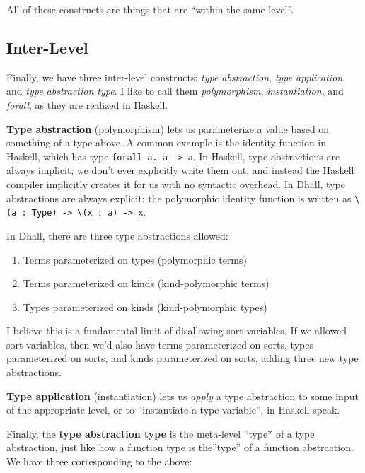 \documentclass[]{article}
\begin{document}
All of these constructs are things that are ``within the same level''.

\subsection{Inter-Level}\label{inter-level}

Finally, we have three inter-level constructs: \emph{type abstraction},
\emph{type application}, and \emph{type abstraction type}. I like to call them
\emph{polymorphism}, \emph{instantiation}, and \emph{forall}, as they are
realized in Haskell.

\textbf{Type abstraction} (polymorphism) lets us parameterize a value based on
something of a type above. A common example is the identity function in Haskell,
which has type \texttt{forall\ a.\ a\ -\textgreater{}\ a}. In Haskell, type
abstractions are always implicit; we don't ever explicitly write them out, and
instead the Haskell compiler implicitly creates it for us with no syntactic
overhead. In Dhall, type abstractions are always explicit: the polymorphic
identity function is written as
\texttt{\textbackslash{}(a\ :\ Type)\ -\textgreater{}\ \textbackslash{}(x\ :\ a)\ -\textgreater{}\ x}.

In Dhall, there are three type abstractions allowed:

\begin{enumerate}
\def\labelenumi{\arabic{enumi}.}
\tightlist
\item
  Terms parameterized on types (polymorphic terms)
\item
  Terms parameterized on kinds (kind-polymorphic terms)
\item
  Types parameterized on kinds (kind-polymorphic types)
\end{enumerate}

I believe this is a fundamental limit of disallowing sort variables. If we
allowed sort-variables, then we'd also have terms parameterized on sorts, types
parameterized on sorts, and kinds parameterized on sorts, adding three new type
abstractions.

\textbf{Type application} (instantiation) lets us \emph{apply} a type
abstraction to some input of the appropriate level, or to ``instantiate a type
variable'', in Haskell-speak.

Finally, the \textbf{type abstraction type} is the meta-level ``type* of a type
abstraction, just like how a function type is the''type'' of a function
abstraction. We have three corresponding to the above:
\end{document}
